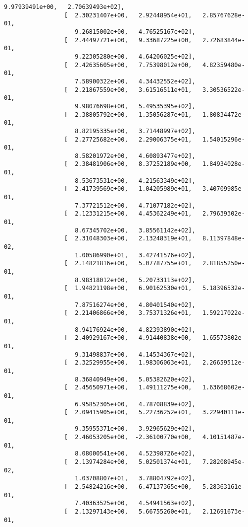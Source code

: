 \documentclass[11pt]{article}
\begin{document}
\begin{Verbatim}[commandchars=\\\{\}]
                    9.97939491e+00,   2.70639493e+02],
                 [  2.30231407e+00,   2.92448954e+01,   2.85767628e-01,
                    9.26815002e+00,   4.76525167e+02],
                 [  2.44497721e+00,   9.33687225e+00,   2.72683844e-01,
                    9.22305280e+00,   4.64206025e+02],
                 [  2.42635605e+00,   7.75398012e+00,   4.82359480e-01,
                    7.58900322e+00,   4.34432552e+02],
                 [  2.21867559e+00,   3.61516511e+01,   3.30536522e-01,
                    9.98076698e+00,   5.49535395e+02],
                 [  2.38805792e+00,   1.35056287e+01,   1.80834472e-01,
                    8.82195335e+00,   3.71448997e+02],
                 [  2.27725682e+00,   2.29006375e+01,   1.54015296e-01,
                    8.58201972e+00,   4.60893477e+02],
                 [  2.38481906e+00,   8.37252189e+00,   1.84934028e-01,
                    8.53673531e+00,   4.21563349e+02],
                 [  2.41739569e+00,   1.04205989e+01,   3.40709985e-01,
                    7.37721512e+00,   4.71077182e+02],
                 [  2.12331215e+00,   4.45362249e+01,   2.79639302e-01,
                    8.67345702e+00,   3.85561142e+02],
                 [  2.31048303e+00,   2.13248319e+01,   8.11397848e-02,
                    1.00586990e+01,   3.42741576e+02],
                 [  2.14821816e+00,   5.07787755e+01,   2.81855250e-01,
                    8.98318012e+00,   5.20733113e+02],
                 [  1.94821198e+00,   6.90162530e+01,   5.18396532e-01,
                    7.87516274e+00,   4.80401540e+02],
                 [  2.21406866e+00,   3.75371326e+01,   1.59217022e-01,
                    8.94176924e+00,   4.82393890e+02],
                 [  2.40929167e+00,   4.91440838e+00,   1.65573802e-01,
                    9.31498837e+00,   4.14534367e+02],
                 [  2.32529955e+00,   1.98306063e+01,   2.26659512e-01,
                    8.36840949e+00,   5.05382620e+02],
                 [  2.45650971e+00,   1.49111275e+00,   1.63668602e-01,
                    6.95852305e+00,   4.78708839e+02],
                 [  2.09415905e+00,   5.22736252e+01,   3.22940111e-01,
                    9.35955371e+00,   3.92965629e+02],
                 [  2.46053205e+00,  -2.36100770e+00,   4.10151487e-01,
                    8.08000541e+00,   4.52398726e+02],
                 [  2.13974284e+00,   5.02501374e+01,   7.28208945e-02,
                    1.03708807e+01,   3.78804792e+02],
                 [  2.54824216e+00,  -6.47137365e+00,   5.28363161e-01,
                    7.40363525e+00,   4.54941563e+02],
                 [  2.13297143e+00,   5.66755260e+01,   2.12691673e-01,

\end{Verbatim}
\end{document}
